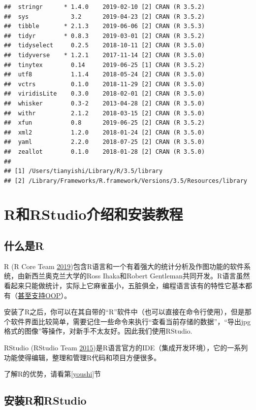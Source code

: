 \documentclass[]{book}
\begin{document}
\begin{verbatim}
##  stringr      * 1.4.0    2019-02-10 [2] CRAN (R 3.5.2)
##  sys            3.2      2019-04-23 [2] CRAN (R 3.5.2)
##  tibble       * 2.1.3    2019-06-06 [2] CRAN (R 3.5.3)
##  tidyr        * 0.8.3    2019-03-01 [2] CRAN (R 3.5.2)
##  tidyselect     0.2.5    2018-10-11 [2] CRAN (R 3.5.0)
##  tidyverse    * 1.2.1    2017-11-14 [2] CRAN (R 3.5.0)
##  tinytex        0.14     2019-06-25 [1] CRAN (R 3.5.2)
##  utf8           1.1.4    2018-05-24 [2] CRAN (R 3.5.0)
##  vctrs          0.1.0    2018-11-29 [2] CRAN (R 3.5.0)
##  viridisLite    0.3.0    2018-02-01 [2] CRAN (R 3.5.0)
##  whisker        0.3-2    2013-04-28 [2] CRAN (R 3.5.0)
##  withr          2.1.2    2018-03-15 [2] CRAN (R 3.5.0)
##  xfun           0.8      2019-06-25 [2] CRAN (R 3.5.2)
##  xml2           1.2.0    2018-01-24 [2] CRAN (R 3.5.0)
##  yaml           2.2.0    2018-07-25 [2] CRAN (R 3.5.0)
##  zeallot        0.1.0    2018-01-28 [2] CRAN (R 3.5.0)
## 
## [1] /Users/tianyishi/Library/R/3.5/library
## [2] /Library/Frameworks/R.framework/Versions/3.5/Resources/library
\end{verbatim}

\hypertarget{intro-and-installation}{%
\chapter{R和RStudio介绍和安装教程}\label{intro-and-installation}}

\hypertarget{r}{%
\section{什么是R}\label{r}}

R (R Core Team \protect\hyperlink{ref-R-base}{2019})包含R语言和一个有着强大的统计分析及作图功能的软件系统，由新西兰奥克兰大学的Ross Ihaka和Robert Gentleman共同开发。R语言虽然看起来只能做统计，实际上它麻雀虽小，五脏俱全，编程语言该有的特性它基本都有（\href{https://adv-r.hadley.nz/oo.html}{甚至支持OOP}）。

安装了R之后，你可以在其自带的``R''软件中（也可以直接在命令行使用），但是那个软件界面比较简单，需要记住一些命令来执行``查看当前存储的数据''，``导出jpg格式的图像''等操作，对新手不太友好。因此我们使用RStudio.

RStudio (RStudio Team \protect\hyperlink{ref-R-rstudio}{2015})是R语言官方的IDE（集成开发环境），它的一系列功能使得编辑，整理和管理R代码和项目方便很多。

了解R的优势，请看第\ref{youshi}节

\hypertarget{rrstudio}{%
\section{安装R和RStudio}\label{rrstudio}}
\end{document}
